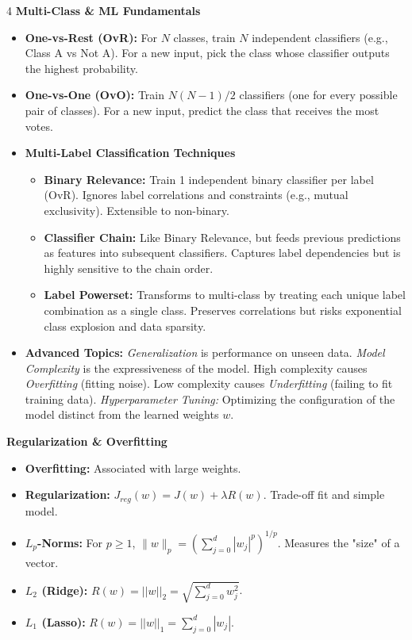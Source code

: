 \documentclass[8pt,landscape,a4paper]{extarticle}
\begin{document}
\begin{multicols*}{4}
\vspace{1mm}
\noindent\textbf{Multi-Class \& ML Fundamentals}
\begin{itemize}[leftmargin=*, nosep]
    \item \textbf{One-vs-Rest (OvR):} For $N$ classes, train $N$ independent classifiers (e.g., Class A vs Not A). For a new input, pick the class whose classifier outputs the highest probability.
    \item \textbf{One-vs-One (OvO):} Train $N(N-1)/2$ classifiers (one for every possible pair of classes). For a new input, predict the class that receives the most votes.
    \item \textbf{Multi-Label Classification Techniques}
    \begin{itemize}[leftmargin=*, nosep]
        \item \textbf{Binary Relevance:} Train 1 independent binary classifier per label (OvR). Ignores label correlations and constraints (e.g., mutual exclusivity). Extensible to non-binary.
        \item \textbf{Classifier Chain:} Like Binary Relevance, but feeds previous predictions as features into subsequent classifiers. Captures label dependencies but is highly sensitive to the chain order.
        \item \textbf{Label Powerset:} Transforms to multi-class by treating each unique label combination as a single class. Preserves correlations but risks exponential class explosion and data sparsity.
    \end{itemize}
    \item \textbf{Advanced Topics:} \textit{Generalization} is performance on unseen data. \textit{Model Complexity} is the expressiveness of the model. High complexity causes \textit{Overfitting} (fitting noise). Low complexity causes \textit{Underfitting} (failing to fit training data). \textit{Hyperparameter Tuning:} Optimizing the configuration of the model distinct from the learned weights $w$.
\end{itemize}

\noindent\textbf{Regularization \& Overfitting}
\begin{itemize}[leftmargin=*, nosep]
    \item \textbf{Overfitting:} Associated with large weights.
    \item \textbf{Regularization:} $J_{reg}(w) = J(w) + \lambda R(w)$. Trade-off fit and simple model.
    \item \textbf{$L_p$-Norms:} For $p \ge 1$, $\|w\|_p = (\sum_{j=0}^d |w_j|^p)^{1/p}$. Measures the "size" of a vector.
    \item \textbf{$L_2$ (Ridge):} $R(w) = ||w||_2 = \sqrt{\sum_{j=0}^d w_j^2}$.
    \item \textbf{$L_1$ (Lasso):} $R(w) = ||w||_1 = \sum_{j=0}^d |w_j|$.
\end{itemize}


\end{multicols*}
\end{document}
